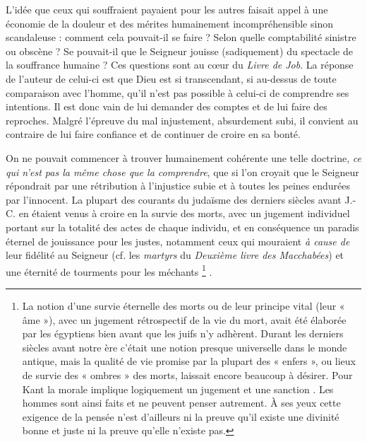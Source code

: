  L'idée que ceux qui souffraient payaient pour les autres faisait appel à une économie de la douleur et des mérites humainement incompréhensible sinon scandaleuse : comment cela pouvait-il se faire ? Selon quelle comptabilité sinistre ou obscène ? Se pouvait-il que le Seigneur jouisse (sadiquement) du spectacle de la souffrance humaine ? Ces questions sont au cœur du \emph{Livre de Job}. La réponse de l'auteur de celui-ci est que Dieu est si transcendant, si au-dessus de toute comparaison avec l'homme, qu'il n'est pas possible à celui-ci de comprendre ses intentions. Il est donc vain de lui demander des comptes et de lui faire des reproches. Malgré l'épreuve du mal injustement, absurdement subi, il convient au contraire de lui faire confiance et de continuer de croire en sa bonté. 

 On ne pouvait commencer à trouver humainement cohérente une telle doctrine, \emph{ce qui n'est pas la même chose que la comprendre}, que si l'on croyait que le Seigneur répondrait par une rétribution  à l'injustice subie et à toutes les peines endurées par l'innocent. La plupart des courants du judaïsme des derniers siècles avant J.-C. en étaient venus à croire en la survie des morts, avec un jugement individuel portant sur la totalité des actes de chaque individu, et en conséquence un paradis éternel de jouissance pour les justes, notamment ceux qui mouraient \emph{à cause de} leur fidélité au Seigneur (cf. les \emph{martyrs} du \emph{Deuxième livre des Macchabées}) et une éternité de tourments pour les méchants%
\footnote{La notion d'une survie éternelle des morts ou de leur principe vital (leur « âme »), avec un jugement rétrospectif de la vie du mort, avait été élaborée par les égyptiens bien avant que les juifs n'y adhèrent. Durant les derniers siècles avant notre ère c'était une notion presque universelle dans le monde antique, mais la qualité de vie promise par la plupart des « enfers », ou lieux de survie des « ombres » des morts, laissait encore beaucoup à désirer. Pour Kant la morale implique logiquement un jugement et une sanction . Les hommes sont ainsi faits et ne peuvent penser autrement. À ses yeux cette exigence de la pensée n'est d'ailleurs ni la preuve qu'il existe une divinité bonne et juste ni la preuve qu'elle n'existe pas.}%
.

